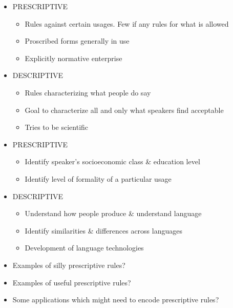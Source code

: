 \documentclass[a4paper,landscape,headrule,footrule]{foils}
\begin{document}
\begin{itemize}
\item
PRESCRIPTIVE
\begin{itemize}
\item Rules against certain
usages. Few if any
rules for what is
allowed
\item Proscribed forms
generally in use
\item Explicitly normative
enterprise
\end{itemize}
\item DESCRIPTIVE
\begin{itemize}
\item Rules characterizing
what people do say
\item Goal to characterize all
and only what speakers
find acceptable
\item Tries to be scientific
\end{itemize}
\end{itemize}


\begin{itemize}
\item PRESCRIPTIVE
  \begin{itemize}
  \item Identify speaker’s
    socioeconomic class
    \& education level
  \item Identify level of
    formality of a
    particular usage
  \end{itemize}
\item DESCRIPTIVE
  \begin{itemize}
  \item Understand how
    people produce \&
    understand language
  \item Identify similarities
    \& differences across
    languages
  \item Development of
    language technologies
  \end{itemize}
\end{itemize}

\begin{itemize}
\item Examples of silly prescriptive rules?
\\ 
\item Examples of useful prescriptive rules?
\\ 
\item Some applications which might need to encode prescriptive rules?
\\ 
\end{itemize}
\end{document}
